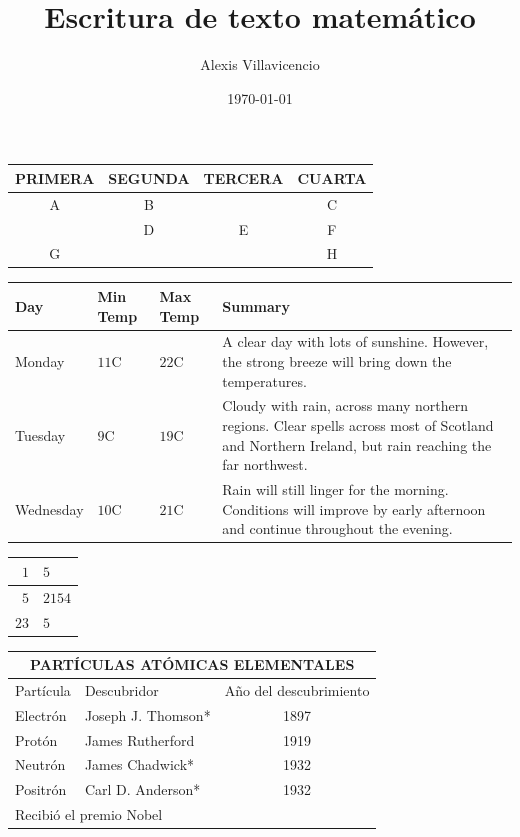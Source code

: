 \documentclass[a4paper,12pt]{article}
\title{Escritura de texto matemático}
\author{Alexis Villavicencio}
\date{\today}
\begin{document}
\maketitle
 
 \begin{tabular}{|c|c|c|c|}
  \hline PRIMERA & SEGUNDA & TERCERA & CUARTA \\ \hline
          A      & B       &         & C       \\\cline{1-3}
                 & D       & E       & F        \\ \hline
          G      &         &         & H        \\ \hline
\end{tabular}

 \begin{center}
 \begin{tabular}{ | l | l | l | p{5cm} |}
 \hline
 Day & Min Temp & Max Temp & Summary \\ \hline

 Monday & \(11\)C & \(22\)C & A clear day with lots of sunshine.
 However, the strong breeze will bring down the temperatures. \\ \hline
 Tuesday & \(9\)C & \(19\)C & Cloudy with rain, across many northern regions. Clear spells
across most of Scotland and Northern Ireland,
 but rain reaching the far northwest. \\ \hline
 Wednesday & \(10\)C & \(21\)C & Rain will still linger for the morning.
 Conditions will improve by early afternoon and continue
 throughout the evening. \\
 \hline
 \end{tabular}
\end{center}

\begin{center}
\begin{tabular}{|r @{-} l|}
\hline
\(1\) & \(5\) \\ \hline
\(5\) & \(2154\) \\ \hline
\(23\)& \(5\) \\ \hline
\end{tabular} 
\end{center}

\begin{tabular}{|l|l|c|}\hline
 \multicolumn{3}{|c|}{PART\'{I}CULAS AT\'{O}MICAS ELEMENTALES} \\
\hline \hline
\textsf{Part\'{i}cula} & \textsf{Descubridor} & \textsf{A\~{n}o del descubrimiento} \\
\hline
Electr\'{o}n & Joseph J. Thomson* & 1897 \\
\hline
Prot\'{o}n & James Rutherford & 1919 \\
\hline
 Neutr\'{o}n & James Chadwick* & 1932 \\
 \hline
 Positr\'{o}n & Carl D. Anderson* & 1932 \\
 \hline
 \multicolumn{2}{l}{\small *Recibi\'{o} el premio Nobel}
 \end{tabular}
\end{document}
